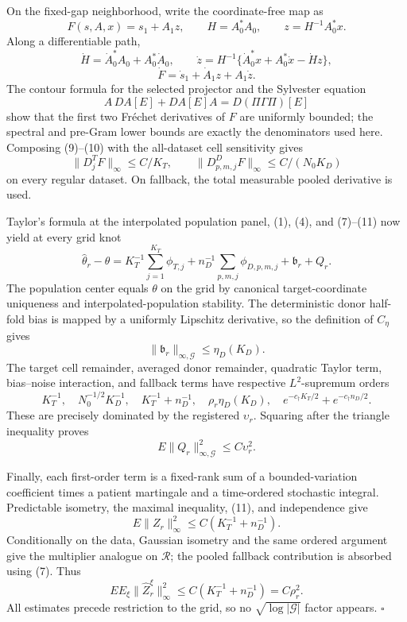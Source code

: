 On the fixed-gap neighborhood, write the coordinate-free map as
\[
 F(s,A,x)=s_1+A_1z,\qquad
 H=A_0^*A_0,\qquad z=H^{-1}A_0^*x.                        \tag{8}
\]
Along a differentiable path,
\[
 \dot H=\dot A_0^*A_0+A_0^*\dot A_0,\qquad
 \dot z=H^{-1}\{\dot A_0^*x+A_0^*\dot x-\dot Hz\},
\]
\[
 \dot F=\dot s_1+\dot A_1z+A_1\dot z.                    \tag{9}
\]
The contour formula for the selected projector and the Sylvester equation
\[
 A\,DA[E]+DA[E]A=D(\Pi\Gamma\Pi)[E]                       \tag{10}
\]
show that the first two Fr\'echet derivatives of \(F\) are uniformly bounded; the spectral and pre-Gram lower bounds are exactly the denominators used here. Composing (9)--(10) with the all-dataset cell sensitivity gives
\[
 \|D_j^TF\|_\infty\le C/K_T,\qquad
 \|D_{p,m,j}^DF\|_\infty\le C/(N_0K_D)                 \tag{11}
\]
on every regular dataset. On fallback, the total measurable pooled derivative is used.

Taylor's formula at the interpolated population panel, (1), (4), and (7)--(11) now yield at every grid knot
\[
 \widehat\theta_r-\theta
 =K_T^{-1}\sum_{j=1}^{K_T}\phi_{T,j}
 +n_D^{-1}\sum_{p,m,j}\phi_{D,p,m,j}
 +\mathfrak b_r+Q_r.                                      \tag{12}
\]
The population center equals \(\theta\) on the grid by canonical target-coordinate uniqueness and interpolated-population stability. The deterministic donor half-fold bias is mapped by a uniformly Lipschitz derivative, so the definition of \(C_\eta\) gives
\[
 \|\mathfrak b_r\|_{\infty,\mathcal G}\le\eta_D(K_D). \tag{13}
\]
The target cell remainder, averaged donor remainder, quadratic Taylor term, bias--noise interaction, and fallback terms have respective \(L^2\)-supremum orders
\[
 K_T^{-1},\quad N_0^{-1/2}K_D^{-1},\quad
 K_T^{-1}+n_D^{-1},\quad \rho_r\eta_D(K_D),\quad
 e^{-c_\dagger K_T/2}+e^{-c_\dagger n_D/2}.               \tag{14}
\]
These are precisely dominated by the registered \(\upsilon_r\). Squaring after the triangle inequality proves
\[
 E\|Q_r\|_{\infty,\mathcal G}^2\le C\upsilon_r^2.       \tag{15}
\]

Finally, each first-order term is a fixed-rank sum of a bounded-variation coefficient times a patient martingale and a time-ordered stochastic integral. Predictable isometry, the maximal inequality, (11), and independence give
\[
 E\|Z_r\|_\infty^2\le C(K_T^{-1}+n_D^{-1}).              \tag{16}
\]
Conditionally on the data, Gaussian isometry and the same ordered argument give the multiplier analogue on \(\mathcal R\); the pooled fallback contribution is absorbed using (7). Thus
\[
 E E_\xi\|\widehat Z_r^\xi\|_\infty^2
 \le C(K_T^{-1}+n_D^{-1})=C\rho_r^2.                     \tag{17}
\]
All estimates precede restriction to the grid, so no \(\sqrt{\log|\mathcal G|}\) factor appears. \(\square\)
